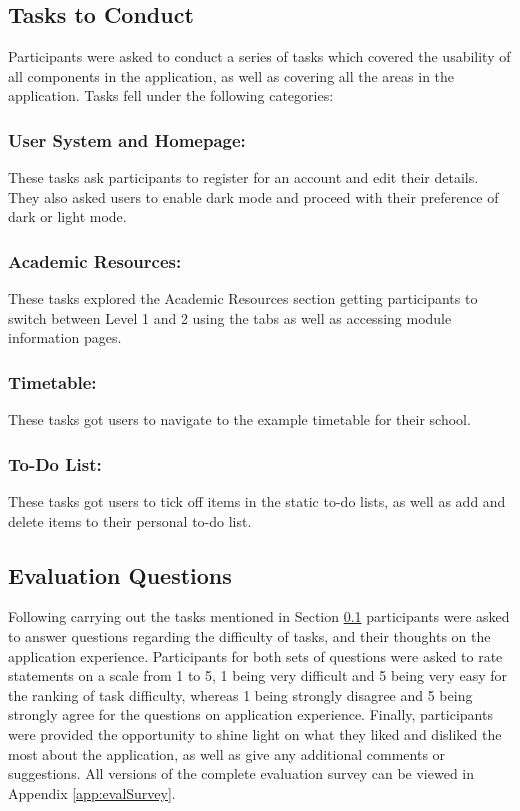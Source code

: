 \documentclass{l4proj}
\begin{document}
\subsection{Tasks to Conduct} \label{tasks}
Participants were asked to conduct a series of tasks which covered the usability of all components in the application,  as well as covering all the areas in the application. Tasks fell under the following categories:

\subsubsection{User System and Homepage:} 
These tasks ask participants to register for an account and edit their details. They also asked users to enable dark mode and proceed with their preference of dark or light mode.

\subsubsection{Academic Resources:}
These tasks explored the Academic Resources section getting participants to switch between Level 1 and 2 using the tabs as well as accessing module information pages.

\subsubsection{Timetable:}
These tasks got users to navigate to the example timetable for their school.

\subsubsection{To-Do List:}
These tasks got users to tick off items in the static to-do lists,  as well as add and delete items to their personal to-do list.

\subsection{Evaluation Questions}
Following carrying out the tasks mentioned in Section \ref{tasks} participants were asked to answer questions regarding the difficulty of tasks,  and their thoughts on the application experience. Participants for both sets of questions were asked to rate statements on a scale from 1 to 5, 1 being very difficult and 5 being very easy for the ranking of task difficulty,  whereas 1 being strongly disagree and 5 being strongly agree for the questions on application experience. Finally,  participants were provided the opportunity to shine light on what they liked and disliked the most about the application,  as well as give any additional comments or suggestions. All versions of the complete evaluation survey can be viewed in Appendix \ref{app:evalSurvey}.
\end{document}
